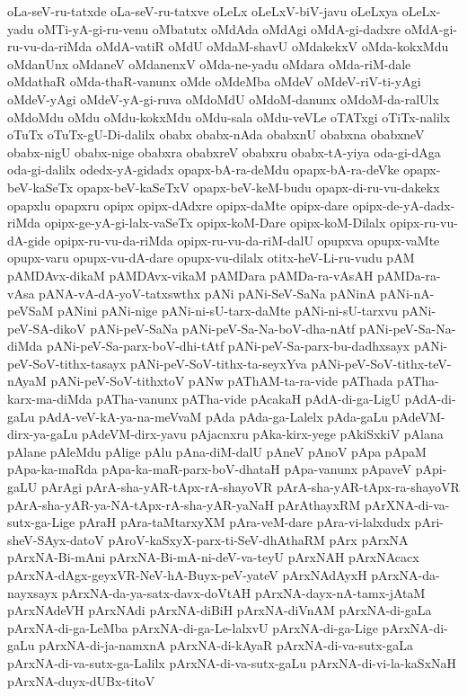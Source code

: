 {oLa-seV-ru-tatxde
oLa-seV-ru-tatxve
oLeLx
oLeLxV-biV-javu
oLeLxya
oLeLx-yadu
oMTi-yA-gi-ru-venu
oMbatutx
oMdAda
oMdAgi
oMdA-gi-dadxre
oMdA-gi-ru-vu-da-riMda
oMdA-vatiR
oMdU
oMdaM-shavU
oMdakekxV
oMda-kokxMdu
oMdanUnx
oMdaneV
oMdanenxV
oMda-ne-yadu
oMdara
oMda-riM-dale
oMdathaR
oMda-thaR-vanunx
oMde
oMdeMba
oMdeV
oMdeV-riV-ti-yAgi
oMdeV-yAgi
oMdeV-yA-gi-ruva
oMdoMdU
oMdoM-danunx
oMdoM-da-ralUlx
oMdoMdu
oMdu
oMdu-kokxMdu
oMdu-sala
oMdu-veVLe
oTATxgi
oTiTx-nalilx
oTuTx
oTuTx-gU-Di-dalilx
obabx
obabx-nAda
obabxnU
obabxna
obabxneV
obabx-nigU
obabx-nige
obabxra
obabxreV
obabxru
obabx-tA-yiya
oda-gi-dAga
oda-gi-dalilx
odedx-yA-gidadx
opapx-bA-ra-deMdu
opapx-bA-ra-deVke
opapx-beV-kaSeTx
opapx-beV-kaSeTxV
opapx-beV-keM-budu
opapx-di-ru-vu-dakekx
opapxlu
opapxru
opipx
opipx-dAdxre
opipx-daMte
opipx-dare
opipx-de-yA-dadx-riMda
opipx-ge-yA-gi-lalx-vaSeTx
opipx-koM-Dare
opipx-koM-Dilalx
opipx-ru-vu-dA-gide
opipx-ru-vu-da-riMda
opipx-ru-vu-da-riM-dalU
opupxva
opupx-vaMte
opupx-varu
opupx-vu-dA-dare
opupx-vu-dilalx
otitx-heV-Li-ru-vudu
pAM
pAMDAvx-dikaM
pAMDAvx-vikaM
pAMDara
pAMDa-ra-vAsAH
pAMDa-ra-vAsa
pANA-vA-dA-yoV-tatxswthx
pANi
pANi-SeV-SaNa
pANinA
pANi-nA-peVSaM
pANini
pANi-nige
pANi-ni-sU-tarx-daMte
pANi-ni-sU-tarxvu
pANi-peV-SA-dikoV
pANi-peV-SaNa
pANi-peV-Sa-Na-boV-dha-nAtf
pANi-peV-Sa-Na-diMda
pANi-peV-Sa-parx-boV-dhi-tAtf
pANi-peV-Sa-parx-bu-dadhxsayx
pANi-peV-SoV-tithx-tasayx
pANi-peV-SoV-tithx-ta-seyxYva
pANi-peV-SoV-tithx-teV-nAyaM
pANi-peV-SoV-tithxtoV
pANw
pAThAM-ta-ra-vide
pAThada
pATha-karx-ma-diMda
pATha-vanunx
pATha-vide
pAcakaH
pAdA-di-ga-LigU
pAdA-di-gaLu
pAdA-veV-kA-ya-na-meVvaM
pAda
pAda-ga-Lalelx
pAda-gaLu
pAdeVM-dirx-ya-gaLu
pAdeVM-dirx-yavu
pAjacnxru
pAka-kirx-yege
pAkiSxkiV
pAlana
pAlane
pAleMdu
pAlige
pAlu
pAna-diM-dalU
pAneV
pAnoV
pApa
pApaM
pApa-ka-maRda
pApa-ka-maR-parx-boV-dhataH
pApa-vanunx
pApaveV
pApi-gaLU
pArAgi
pArA-sha-yAR-tApx-rA-shayoVR
pArA-sha-yAR-tApx-ra-shayoVR
pArA-sha-yAR-ya-NA-tApx-rA-sha-yAR-yaNaH
pArAthayxRM
pArXNA-di-va-sutx-ga-Lige
pAraH
pAra-taMtarxyXM
pAra-veM-dare
pAra-vi-lalxdudx
pAri-sheV-SAyx-datoV
pAroV-kaSxyX-parx-ti-SeV-dhAthaRM
pArx
pArxNA
pArxNA-Bi-mAni
pArxNA-Bi-mA-ni-deV-va-teyU
pArxNAH
pArxNAcacx
pArxNA-dAgx-geyxVR-NeV-hA-Buyx-peV-yateV
pArxNAdAyxH
pArxNA-da-nayxsayx
pArxNA-da-ya-satx-davx-doVtAH
pArxNA-dayx-nA-tamx-jAtaM
pArxNAdeVH
pArxNAdi
pArxNA-diBiH
pArxNA-diVnAM
pArxNA-di-gaLa
pArxNA-di-ga-LeMba
pArxNA-di-ga-Le-lalxvU
pArxNA-di-ga-Lige
pArxNA-di-gaLu
pArxNA-di-ja-namxnA
pArxNA-di-kAyaR
pArxNA-di-va-sutx-gaLa
pArxNA-di-va-sutx-ga-Lalilx
pArxNA-di-va-sutx-gaLu
pArxNA-di-vi-la-kaSxNaH
pArxNA-duyx-dUBx-titoV
}
